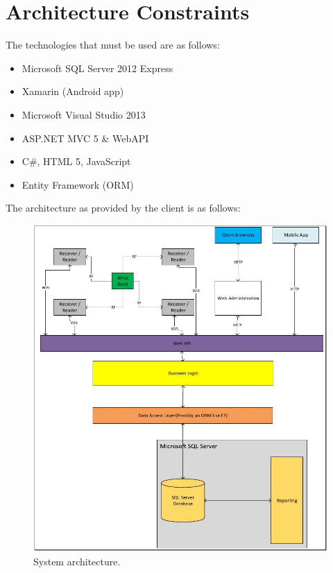 \documentclass[11pt,titlepage]{article}
\begin{document}
\section{Architecture Constraints}
The technologies that must be used are as follows:
\begin{itemize}
\item Microsoft SQL Server 2012 Express
\item Xamarin (Android app)
\item Microsoft Visual Studio 2013
\item ASP.NET MVC 5 \& WebAPI
\item C\#, HTML 5, JavaScript
\item Entity Framework (ORM)
\end{itemize}
The architecture as provided by the client is as follows:
\begin{figure}[H]
\begin{center}
\includegraphics[scale=0.8]{Architecture.jpg}
\caption{System architecture.}
\end{center}
\end{figure}
\end{document}
